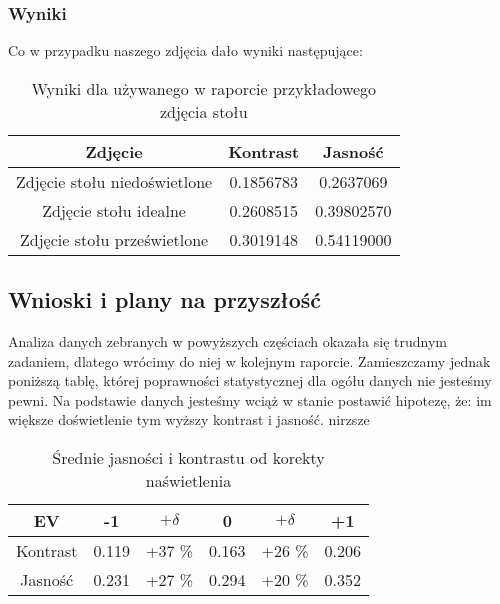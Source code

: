 \documentclass[]{mwart}
\begin{document}
\subsubsection{Wyniki}
Co w przypadku naszego zdjęcia dało wyniki następujące:

\begin{table}[h]
    \centering
    \begin{tabular}{|c|c|c|}
        \hline
        Zdjęcie                      & Kontrast  & Jasność    \\ \hline
        Zdjęcie stołu niedoświetlone & 0.1856783 & 0.2637069  \\ \hline
        Zdjęcie stołu idealne        & 0.2608515 & 0.39802570 \\ \hline
        Zdjęcie stołu prześwietlone  & 0.3019148 & 0.54119000 \\ \hline
    \end{tabular}
    \caption{Wyniki dla używanego w raporcie przykładowego zdjęcia stołu}
\end{table}

\newpage
\subsection{Wnioski i plany na przyszłość}
Analiza danych zebranych w powyższych częściach okazała się trudnym zadaniem,
dlatego wrócimy do niej w kolejnym raporcie. Zamieszczamy jednak poniższą tablę,
której poprawności statystycznej dla ogółu danych nie jesteśmy pewni. Na podstawie
danych jesteśmy wciąż w stanie postawić hipotezę, że: im większe doświetlenie tym
wyższy kontrast i jasność. nirzsze


\begin{table}[h]
    \centering
    \begin{tabular}{|c|c|c|c|c|c|}
        \hline
        EV       & -1    & $+\delta$ & 0     & $+\delta$ & +1    \\ \hline
        Kontrast & 0.119 & +37 \%    & 0.163 & +26 \%    & 0.206 \\ \hline
        Jasność  & 0.231 & +27 \%    & 0.294 & +20 \%    & 0.352 \\ \hline
    \end{tabular}
    \caption{Średnie jasności i kontrastu od korekty naświetlenia}

\end{table}
\end{document}
